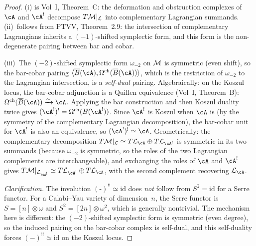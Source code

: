 \begin{proof}
(i) is Vol~I, Theorem~C: the deformation and obstruction complexes
of $\cA$ and $\cA^!$ decompose $T\mathcal M|_\mathcal L$ into complementary
Lagrangian summands. (ii)~follows from PTVV, Theorem~2.9: the
intersection of complementary Lagrangians inherits a $(-1)$-shifted
symplectic form, and this form is the non-degenerate pairing between
bar and cobar.

(iii)~The $(-2)$-shifted symplectic form $\omega_{-2}$ on $\mathcal M$ is
symmetric (even shift), so the bar-cobar pairing
$\langle \barB(\cA), \Omegach(\barB(\cA)) \rangle$, which is the
restriction of $\omega_{-2}$ to the Lagrangian intersection, is
a \emph{self-dual} pairing. Algebraically: on the Koszul locus, the
bar-cobar adjunction is a Quillen equivalence
(Vol~I, Theorem~B): $\Omegach(\barB(\cA)) \xrightarrow{\sim} \cA$.
Applying the bar construction and then Koszul duality twice gives
$(\cA^!)^! = \Omegach(\barB(\cA^!))$. Since $\cA^!$ is Koszul when
$\cA$ is (by the symmetry of the complementary Lagrangian
decomposition), the bar-cobar unit for $\cA^!$ is also an
equivalence, so $(\cA^!)^! \simeq \cA$. Geometrically: the
complementary decomposition $T\cM|_\cL \simeq T\cL_\cA \oplus
T\cL_{\cA^!}$ is symmetric in its two summands (because
$\omega_{-2}$ is symmetric, so the roles of the two Lagrangian
complements are interchangeable), and
exchanging the roles of $\cA$ and $\cA^!$ gives
$T\cM|_{\cL_{\cA^!}} \simeq T\cL_{\cA^!} \oplus T\cL_\cA$, with
the second complement recovering $\cL_\cA$.

\smallskip
\noindent\emph{Clarification.}
The involution $(\text{-})^{!!} \simeq \mathrm{id}$ does \emph{not}
follow from $S^2 = \mathrm{id}$ for a Serre functor. For a
Calabi--Yau variety of dimension~$n$, the Serre functor is
$S = [n] \otimes \omega$ and $S^2 = [2n] \otimes \omega^2$, which is
generally nontrivial. The mechanism here is different: the
$(-2)$-shifted symplectic form is symmetric (even degree), so the
induced pairing on the bar-cobar complex is self-dual, and this
self-duality forces $(-)^{!!} \simeq \mathrm{id}$ on the Koszul
locus.
\end{proof}

